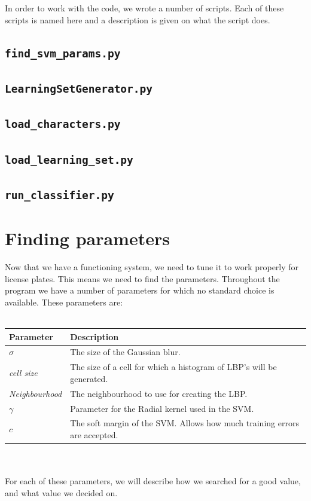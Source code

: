 \documentclass[a4paper]{article}
\begin{document}
In order to work with the code, we wrote a number of scripts. Each of these
scripts is named here and a description is given on what the script does.

\subsection*{\texttt{find\_svm\_params.py}}



\subsection*{\texttt{LearningSetGenerator.py}}



\subsection*{\texttt{load\_characters.py}}



\subsection*{\texttt{load\_learning\_set.py}}



\subsection*{\texttt{run\_classifier.py}}


\section{Finding parameters}

Now that we have a functioning system, we need to tune it to work properly for
license plates. This means we need to find the parameters. Throughout the
program we have a number of parameters for which no standard choice is
available. These parameters are:\\
\\
\begin{tabular}{l|l}
	Parameter 			& Description\\
	\hline
	$\sigma$  			& The size of the Gaussian blur.\\
	\emph{cell size}	& The size of a cell for which a histogram of LBP's
	                      will be generated.\\
	\emph{Neighbourhood}& The neighbourhood to use for creating the LBP.\\
	$\gamma$			& Parameter for the Radial kernel used in the SVM.\\
	$c$					& The soft margin of the SVM. Allows how much training
						  errors are accepted.\\
\end{tabular}\\
\\
For each of these parameters, we will describe how we searched for a good
value, and what value we decided on.
\end{document}
